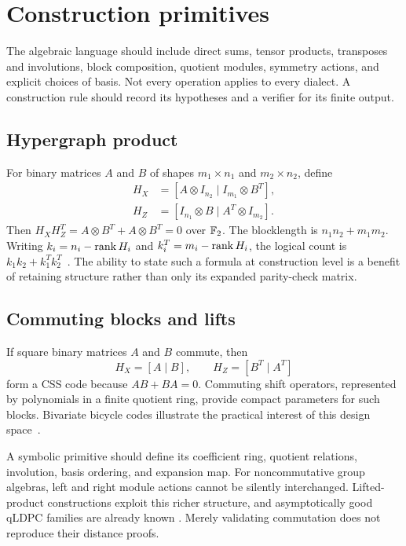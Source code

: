 \section{Construction primitives}

The algebraic language should include direct sums, tensor products,
transposes and involutions, block composition, quotient modules, symmetry
actions, and explicit choices of basis. Not every operation applies to
every dialect. A construction rule should record its hypotheses and a
verifier for its finite output.

\subsection{Hypergraph product}
For binary matrices $A$ and $B$ of shapes $m_1\times n_1$ and
$m_2\times n_2$, define
\begin{align}
 H_X&=[A\otimes I_{n_2}\mid I_{m_1}\otimes B^T],\\
 H_Z&=[I_{n_1}\otimes B\mid A^T\otimes I_{m_2}].
\end{align}
Then $H_XH_Z^T=A\otimes B^T+A\otimes B^T=0$ over $\mathbb{F}_2$.
The blocklength is $n_1n_2+m_1m_2$. Writing
$k_i=n_i-\operatorname{rank} H_i$ and $k_i^T=m_i-\operatorname{rank} H_i$, the logical count is
$k_1k_2+k_1^Tk_2^T$~\cite{tillich2014}. The ability to state such a
formula at construction level is a benefit of retaining structure rather
than only its expanded parity-check matrix.

\subsection{Commuting blocks and lifts}
If square binary matrices $A$ and $B$ commute, then
\begin{equation}
 H_X=[A\mid B],\qquad H_Z=[B^T\mid A^T]
\end{equation}
form a CSS code because $AB+BA=0$. Commuting shift operators, represented
by polynomials in a finite quotient ring, provide compact parameters for
such blocks. Bivariate bicycle codes illustrate the practical interest
of this design space~\cite{bravyi2024}.

A symbolic primitive should define its coefficient ring, quotient
relations, involution, basis ordering, and expansion map. For
noncommutative group algebras, left and right module actions cannot be
silently interchanged. Lifted-product constructions exploit this richer
structure, and asymptotically good qLDPC families are already known
\cite{panteleev2022}. Merely validating commutation does not reproduce
their distance proofs.

